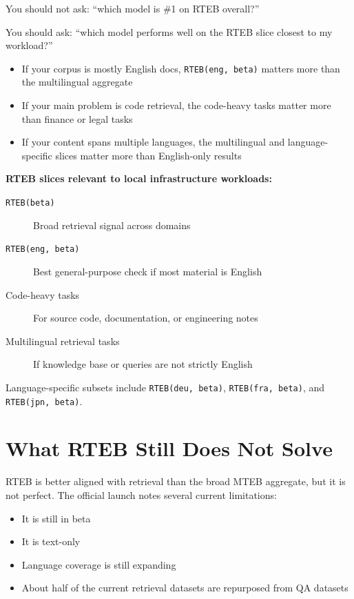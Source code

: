 You should not ask: ``which model is \#1 on RTEB overall?''

You should ask: ``which model performs well on the RTEB slice closest to my workload?''

\begin{itemize}
    \item If your corpus is mostly English docs, \texttt{RTEB(eng, beta)} matters more than
          the multilingual aggregate
    \item If your main problem is code retrieval, the code-heavy tasks matter more than
          finance or legal tasks
    \item If your content spans multiple languages, the multilingual and language-specific
          slices matter more than English-only results
\end{itemize}

\textbf{RTEB slices relevant to local infrastructure workloads:}

\begin{description}
    \item[\texttt{RTEB(beta)}] Broad retrieval signal across domains
    \item[\texttt{RTEB(eng, beta)}] Best general-purpose check if most material is English
    \item[Code-heavy tasks] For source code, documentation, or engineering notes
    \item[Multilingual retrieval tasks] If knowledge base or queries are not strictly English
\end{description}

Language-specific subsets include \texttt{RTEB(deu, beta)}, \texttt{RTEB(fra, beta)}, and
\texttt{RTEB(jpn, beta)}.

\section{What RTEB Still Does Not Solve}

RTEB is better aligned with retrieval than the broad MTEB aggregate, but it is not perfect.
The official launch notes several current limitations:

\begin{itemize}
    \item It is still in beta
    \item It is text-only
    \item Language coverage is still expanding
    \item About half of the current retrieval datasets are repurposed from QA datasets
\end{itemize}

